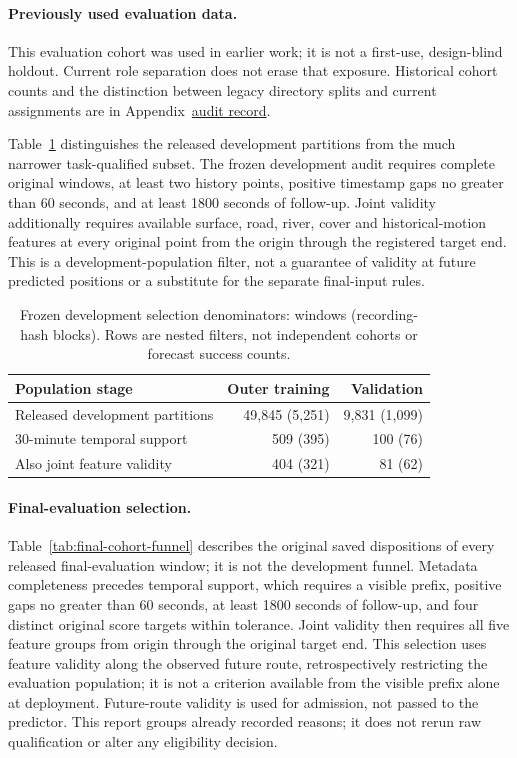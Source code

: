 \paragraph{Previously used evaluation data.}
This evaluation cohort was used in earlier work; it is not a first-use,
design-blind holdout. Current role separation does not erase that exposure.
Historical cohort counts and the distinction between legacy directory splits
and current assignments are in Appendix~\href{audit-notes.pdf\#sec:source-reconciliation-details}{audit record}.

Table~\ref{tab:cohort-denominators} distinguishes the released development
partitions from the much narrower task-qualified subset. The frozen
development audit requires complete original windows, at least two history
points, positive timestamp gaps no greater than 60 seconds, and at least
1800 seconds of follow-up. Joint validity additionally requires available
surface, road, river, cover and historical-motion features at every original
point from the origin through the registered target end. This is a
development-population filter, not a guarantee of validity at future
predicted positions or a substitute for the separate final-input rules.

\begin{table}[htbp]
\centering\small
\caption{Frozen development selection denominators: windows (recording-hash blocks).
Rows are nested filters, not independent cohorts or forecast success counts.}
\label{tab:cohort-denominators}\hypertarget{tab:cohort-denominators}{}
\begin{tabular}{@{}p{.46\linewidth}rr@{}}
\toprule
Population stage & Outer training & Validation\\
\midrule
Released development partitions & 49,845 (5,251) & 9,831 (1,099)\\
30-minute temporal support & 509 (395) & 100 (76)\\
Also joint feature validity & 404 (321) & 81 (62)\\
\bottomrule
\end{tabular}
\end{table}

\paragraph{Final-evaluation selection.}\label{sec:final-cohort-funnel}\hypertarget{sec:final-cohort-funnel}{}
Table~\ref{tab:final-cohort-funnel} describes the original saved dispositions
of every released final-evaluation window; it is not the development funnel.
Metadata completeness precedes temporal support, which requires a visible
prefix, positive gaps no greater than 60 seconds, at least 1800 seconds of
follow-up, and four distinct original score targets within tolerance.
Joint validity then requires all five feature groups from origin through
the original target end. This selection uses feature validity along the
observed future route, retrospectively restricting the evaluation population;
it is not a criterion available from the visible prefix alone at deployment.
Future-route validity is used for admission, not passed to the predictor.
This report groups already recorded reasons;
it does not rerun raw qualification or alter any eligibility decision.


